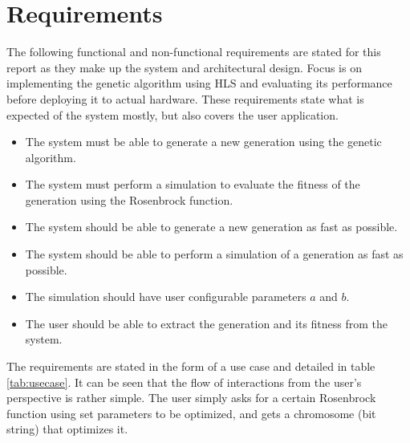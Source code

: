 \section{Requirements}\label{sec:req}

The following functional and non-functional requirements are stated for this report as they make up the system and architectural design. Focus is on implementing the genetic algorithm using HLS and evaluating its performance before deploying it to actual hardware. These requirements state what is expected of the system mostly, but also covers the user application.

\begin{itemize}
\item The system must be able to generate a new generation using the genetic algorithm.
\item The system must perform a simulation to evaluate the fitness of the generation using the Rosenbrock function.
\item The system should be able to generate a new generation as fast as possible.
\item The system should be able to perform a simulation of a generation as fast as possible.
\item The simulation should have user configurable parameters $a$ and $b$.
\item The user should be able to extract the generation and its fitness from the system.
\end{itemize}

The requirements are stated in the form of a use case and detailed in table \ref{tab:usecase}. It can be seen that the flow of interactions from the user's perspective is rather simple. The user simply asks for a certain Rosenbrock function using set parameters to be optimized, and gets a chromosome (bit string) that optimizes it.


